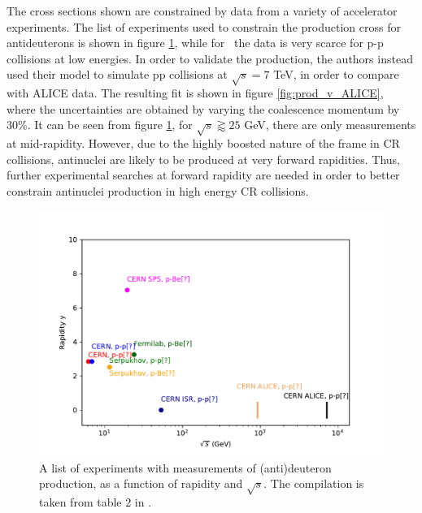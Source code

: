 The cross sections shown are constrained by data from a variety of accelerator experiments. The list of experiments used to constrain the production cross for antideuterons is shown in figure \ref{fig:dbar_prod_v_rapidity}, while for \ahe\ the data is very scarce for p-p collisions at low energies. In order to validate the production, the authors instead used their model to simulate pp collisions at $\sqrt{s}=7$ TeV, in order to compare with ALICE data. The resulting fit is shown in figure \ref{fig:prod_v_ALICE}, where the uncertainties are obtained by varying the coalescence momentum by 30\%. It can be seen from figure \ref{fig:dbar_prod_v_rapidity}, for $\sqrt{s} \gtrapprox 25$ GeV, there are only measurements at mid-rapidity. However, due to the highly boosted nature of the frame in CR collisions, antinuclei are likely to be produced at very forward rapidities. Thus, further experimental searches at forward rapidity are needed in order to better constrain antinuclei production in high energy CR collisions.  

\begin{figure}[htbp]
    \centering
    \includegraphics[width=\textwidth]{figures/dbar_production_experiments_sqrts_v_rapidity.pdf}
    \caption{A list of experiments with measurements of (anti)deuteron production, as a function of rapidity and $\sqrt{s}$. The compilation is taken from table 2 in \cite{Gomez}.}
    \label{fig:dbar_prod_v_rapidity}
\end{figure}

